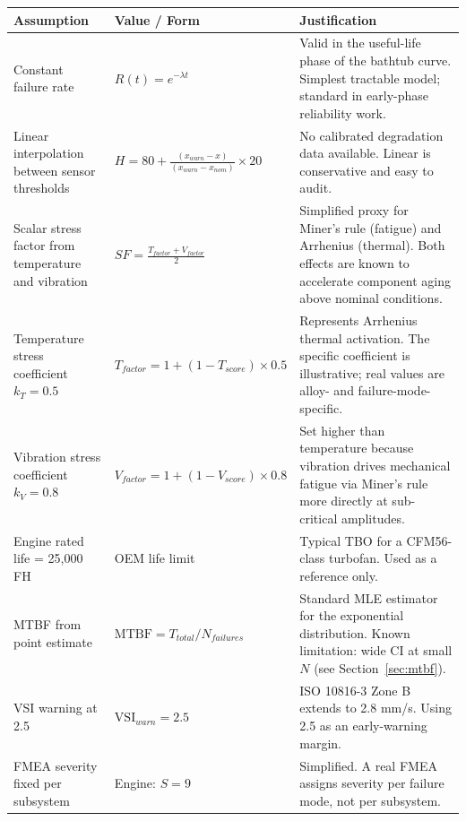 \documentclass[11pt, a4paper]{report}
\begin{document}
\begin{longtable}{@{}p{5cm} p{4.5cm} p{5cm}@{}}
  \toprule
  \textbf{Assumption} & \textbf{Value / Form} & \textbf{Justification} \\
  \midrule
  \endhead
  Constant failure rate &
  $R(t) = e^{-\lambda t}$ &
  Valid in the useful-life phase of the bathtub curve. Simplest tractable model;
  standard in early-phase reliability work. \\
  \addlinespace
  Linear interpolation between sensor thresholds &
  $H = 80 + \frac{(x_{warn} - x)}{(x_{warn} - x_{nom})} \times 20$ &
  No calibrated degradation data available. Linear is conservative and easy to
  audit. \\
  \addlinespace
  Scalar stress factor from temperature and vibration &
  $SF = \frac{T_{factor} + V_{factor}}{2}$ &
  Simplified proxy for Miner's rule (fatigue) and Arrhenius (thermal). Both
  effects are known to accelerate component aging above nominal conditions. \\
  \addlinespace
  Temperature stress coefficient $k_T = 0.5$ &
  $T_{factor} = 1 + (1 - T_{score}) \times 0.5$ &
  Represents Arrhenius thermal activation. The specific coefficient is
  illustrative; real values are alloy- and failure-mode-specific. \\
  \addlinespace
  Vibration stress coefficient $k_V = 0.8$ &
  $V_{factor} = 1 + (1 - V_{score}) \times 0.8$ &
  Set higher than temperature because vibration drives mechanical fatigue via
  Miner's rule more directly at sub-critical amplitudes. \\
  \addlinespace
  Engine rated life = 25,000 FH &
  OEM life limit &
  Typical TBO for a CFM56-class turbofan. Used as a reference only. \\
  \addlinespace
  MTBF from point estimate &
  $\text{MTBF} = T_{total} / N_{failures}$ &
  Standard MLE estimator for the exponential distribution. Known limitation:
  wide CI at small $N$ (see Section~\ref{sec:mtbf}). \\
  \addlinespace
  VSI warning at 2.5 &
  $\text{VSI}_{warn} = 2.5$ &
  ISO 10816-3 Zone B extends to 2.8 mm/s. Using 2.5 as an early-warning margin. \\
  \addlinespace
  FMEA severity fixed per subsystem &
  Engine: $S = 9$ &
  Simplified. A real FMEA assigns severity per failure mode, not per subsystem. \\
  \bottomrule
\end{longtable}

\end{document}
